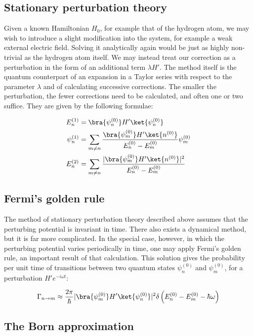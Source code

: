\subsection{Stationary perturbation theory}

Given a known Hamiltonian $H_0$, for example that of the hydrogen atom, we may wish to introduce a slight modification into the system, for example a weak external electric field. Solving it analytically again would be just as highly non-trivial as the hydrogen atom itself. We may instead treat our correction as a perturbation in the form of an additional term $\lambda H'$. The method itself is the quantum counterpart of an expansion in a Taylor series with respect to the parameter $\lambda$ and of calculating successive corrections. The smaller the perturbation, the fewer corrections need to be calculated, and often one or two suffice. They are given by the following formulae:

\begin{align*}
    E_n^{(1)} &= \bra{\psi_n^{(0)}} H' \ket{\psi_n^{(0)}} \\
    \psi_n^{(1)} &= \sum_{m \neq n} \frac{\bra{\psi_m^{(0)}} H' \ket{n^{(0)}}}{E_n^{(0)} - E_m^{(0)}} \psi_m^{(0)} \\
    E_n^{(2)} &= \sum_{m \neq n} \frac{|\bra{\psi_m^{(0)}} H' \ket{n^{(0)}}|^2}{E_n^{(0)} - E_m^{(0)}}
\end{align*}

\subsection{Fermi's golden rule}

The method of stationary perturbation theory described above assumes that the perturbing potential is invariant in time. There also exists a dynamical method, but it is far more complicated. In the special case, however, in which the perturbing potential varies periodically in time, one may apply Fermi's golden rule, an important result of that calculation. This solution gives the probability per unit time of transitions between two quantum states $\psi_n^{(0)}$ and $\psi_m^{(0)}$, for a perturbation $H'e^{-i\omega t}$:

\[
\Gamma_{n\rightarrow{}m} \approx \frac{2\pi}{\hbar} |\bra{\psi_m^{(0)}}H'\ket{\psi_n^{(0)}}|^2 \delta\left(E_n^{(0)} - E_m^{(0)} - \hbar\omega\right)
\]

\subsection{The Born approximation}


